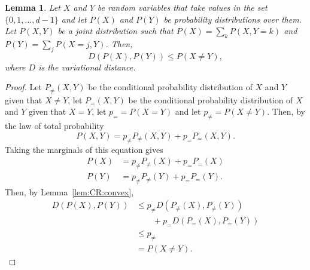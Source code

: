 \documentclass[DIV=calc,paper=a4,fontsize=11pt,twocolumn]{scrartcl} %
\theoremstyle{definition}
\theoremstyle{plain}
\newtheorem{lemma}[definition]{Lemma}
\begin{document}
\begin{lemma}
\label{lem:CR:couple}
Let $X$ and $Y$ be random variables that take values in the set
$\{0,1,\ldots,d-1\}$ and let $P(X)$ and $P(Y)$ be probability
distributions over them.  Let $P(X,Y)$ be a joint distribution such
that $P(X) = \sum_k P(X,Y=k)$ and $P(Y) = \sum_j P(X=j, Y)$.  Then,
\begin{equation}
D \left ( P(X),P(Y) \right ) \leq P(X \neq Y),
\end{equation}
where $D$ is the variational distance.
\end{lemma}
\begin{proof}
Let $P_{\neq}(X,Y)$ be the conditional probability distribution of
$X$ and $Y$ given that $X \neq Y$, let $P_{=}(X,Y)$ be the
conditional probability distribution of $X$ and $Y$ given that
$X=Y$, let $p_= = P(X=Y)$ and let $p_{\neq} = P(X \neq Y)$.  Then,
by the law of total probability
\begin{equation}
P(X,Y) = p_{\neq}P_{\neq}(X,Y)  + p_{=}P_{=}(X,Y).
\end{equation}
Taking the marginals of this equation gives
\begin{align}
P(X) & = p_{\neq}P_{\neq}(X) + p_{=}P_{=}(X) \\
P(Y) & = p_{\neq}P_{\neq}(Y) + p_{=}P_{=}(Y).
\end{align}
Then, by Lemma~\ref{lem:CR:convex},
\begin{align}
D(P(X),P(Y)) & \leq p_{\neq} D(P_{\neq}(X), P_{\neq}(Y)) \nonumber\\
&\quad\quad + p_{=}
D(P_{=}(X),P_{=}(Y))  \\
& \leq p_{\neq} \\
& = P(X \neq Y).
\end{align}
\end{proof}
\end{document}
